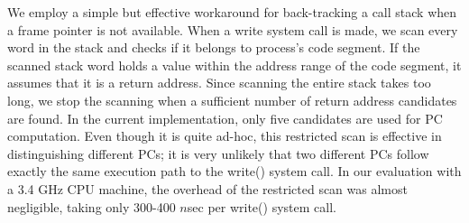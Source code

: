 We employ a simple but effective workaround for back-tracking a call stack when
a frame pointer is not available.  When a write system call is made,
we scan every word in the stack
and checks if it belongs to process's code segment.  If the scanned stack word
holds a value within the address range of the code segment, it assumes that it
is a return address.  Since scanning the entire stack takes too long, we stop
the scanning when a sufficient number of return address candidates are found.
In the current implementation, only five candidates are used for PC
computation.  Even though it is quite ad-hoc, this restricted scan is effective
in distinguishing different PCs; it is very unlikely that two different PCs
follow exactly the same execution path to the \textsf{\small write()} system
call.  In our evaluation with a 3.4 GHz CPU machine, the overhead of the
restricted scan was almost negligible, taking only 300-400 $n$sec per
\textsf{\small write()} system call.

